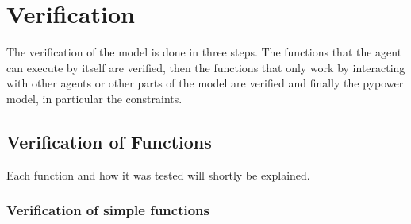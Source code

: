 \documentclass[a4paper]{article}
\begin{document}
\section{Verification}
The verification of the model is done in three steps. The functions that the agent can execute by itself
are verified, then the functions that only work by interacting with other agents or other parts of the
model are verified and finally the pypower model, in particular the constraints. 
\subsection{Verification of Functions}
Each function and how it was tested will shortly be explained. 
\subsubsection{Verification of simple functions}
\end{document}
